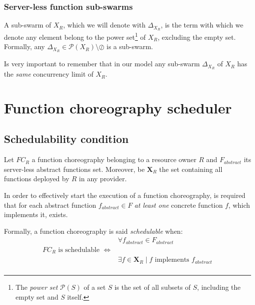 \documentclass[10pt,a4paper]{article}
\begin{document}
\subsubsection{Server-less function sub-swarms}

A sub-swarm of ${X_{R}}$, which we will denote with $\Delta_{X_{R}}$, is the term with which we denote any element belong to the power set\footnote{The \textit{power set} $\mathcal{P}(S)$ of a set $S$ is the set of all subsets of $S$, including the empty set and $S$ itself.} of $X_{R}$, excluding the empty set. Formally, any $\Delta_{X_{R}} \in \mathcal{P}(X_{R}) \setminus \oslash$ is a sub-swarm.

Is very important to remember that in our model any sub-swarm $\Delta_{X_{R}}$ of ${X_{R}}$ has the \textit{same} concurrency limit of ${X_{R}}$.

\section{Function choreography scheduler}

\subsection{Schedulability condition}

Let $FC_R$ a function choreography belonging to a resource owner $R$ and $F_{abstract}$ its server-less abstract functions set. Moreover, be $\textbf{X}_R$ the set containing all functions deployed by $R$ in any provider.

In order to effectively start the execution of a function choreography, is required that for each abstract function $f_{abstract} \in F$ \textit{at least one} concrete function $f$, which implements it, exists.

Formally, a function choreography is said \textit{schedulable} when: 
\begin{equation}
\label{eqn:SchedulabilityConditionOne}
\begin{array}{lc}

& \forall f_{abstract} \in F_{abstract} \\

FC_R \text{ is schedulable } \Leftrightarrow & \\
 & \exists f \in \textbf{X}_R \mid  f \text{ implements } f_{abstract} \\
\end{array}
\end{equation}
\end{document}
